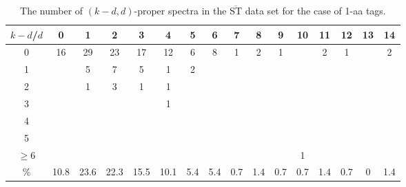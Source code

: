 \documentclass{article}[12pt]
\def\STbar{{\overline{\mathrm{ST}}}}
\begin{document}
\begin{landscape}

\begin{table}[h]\footnotesize
{\centering
\begin{tabular}{|c|c|
c|c|c|c|c|c|c|c|c|c|c|c|c|c|}
  \hline
  $k-d$/$d$ 
 & 0 & 1 & 2 & 3 & 4 & 5 & 6 & 7 & 8 & 9 & 10 & 11 & 12 & 13 & 14\\

  \hline
  \hline

0 & 16 & 29 & 23 & 17 & 12 & 6 & 8 & 1 & 2 & 1 &  & 2 & 1 &  & 2\\

1 &  & 5 & 7 & 5 & 1 & 2 &  &  &  &  &  &  &  &  & \\

2 &  & 1 & 3 & 1 & 1 &  &  &  &  &  &  &  &  &  & \\

3 &  &  &  &  & 1 &  &  &  &  &  &  &  &  &  & \\

4 &  &  &  &  &  &  &  &  &  &  &  &  &  &  & \\

5 &  &  &  &  &  &  &  &  &  &  &  &  &  &  & \\

$\ge6 $  &  &  &  &  &  &  &  &  &  &  & 1 &  &  &  & \\

  \hline

 \%  & 10.8 & 23.6 & 22.3 & 15.5 & 10.1 & 5.4 & 5.4 & 0.7 & 1.4 & 0.7 & 0.7 & 1.4 & 0.7 & 0 & 1.4\\

  \hline
\end{tabular}
\par}
\centering
\caption{The number of $(k-d,d)$-proper spectra in the $\STbar$ data set for the case of 1-aa tags.}
\vspace{3mm}
\label{table:kd-1-proper-ST-bar2}
\end{table}
\end{landscape}
\end{document}
